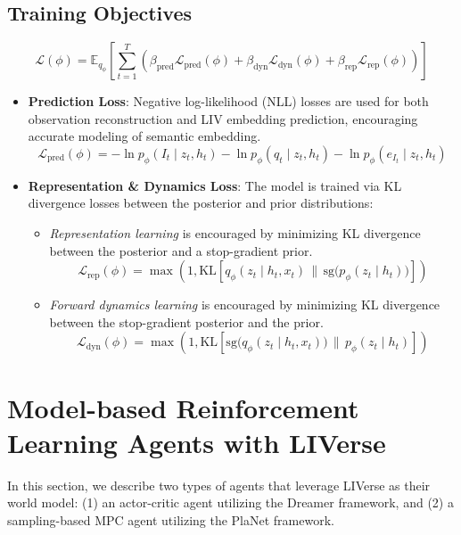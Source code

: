 \documentclass[11pt]{article}
\begin{document}
\subsection{Training Objectives}
\begin{equation}
\mathcal{L}(\phi) = \mathbb{E}_{q_\phi} \left[ \sum_{t=1}^{T} \left( 
\beta_{\mathrm{pred}} \mathcal{L}_{\mathrm{pred}}(\phi) 
+ \beta_{\mathrm{dyn}} \mathcal{L}_{\mathrm{dyn}}(\phi) 
+ \beta_{\mathrm{rep}} \mathcal{L}_{\mathrm{rep}}(\phi)
\right) \right]
\end{equation}
\begin{itemize}
    \item \textbf{Prediction Loss}: Negative log-likelihood (NLL) losses are used for both observation reconstruction and LIV embedding prediction, encouraging accurate modeling of semantic embedding.
    \begin{equation}
    \mathcal{L}_{\mathrm{pred}}(\phi) = 
    - \ln p_\phi(I_t \mid z_t, h_t)
    - \ln p_\phi(q_t \mid z_t, h_t)
    - \ln p_\phi(e_{I_t} \mid z_t, h_t)
    \end{equation}
    \item \textbf{Representation \& Dynamics Loss}: The model is trained via KL divergence losses between the posterior and prior distributions:
    \begin{itemize}
        \item \textit{Representation learning} is encouraged by minimizing KL divergence between the posterior and a stop-gradient prior. \begin{equation}
\mathcal{L}_{\mathrm{rep}}(\phi) = \max\left(1, \mathrm{KL}\left[ q_\phi(z_t \mid h_t, x_t) \,\|\, \mathrm{sg}\big(p_\phi(z_t \mid h_t)\big) \right] \right)
\end{equation}
        \item \textit{Forward dynamics learning} is encouraged by minimizing KL divergence between the stop-gradient posterior and the prior. \begin{equation}
\mathcal{L}_{\mathrm{dyn}}(\phi) = \max\left(1, \mathrm{KL}\left[ \mathrm{sg}\big(q_\phi(z_t \mid h_t, x_t)\big) \,\|\, p_\phi(z_t \mid h_t) \right] \right)
\end{equation}
    \end{itemize}
\end{itemize}

\section{Model-based Reinforcement Learning Agents with LIVerse}
In this section, we describe two types of agents that leverage LIVerse as their world model: (1) an actor-critic agent utilizing the Dreamer framework, and (2) a sampling-based MPC agent utilizing the PlaNet framework.
\end{document}
